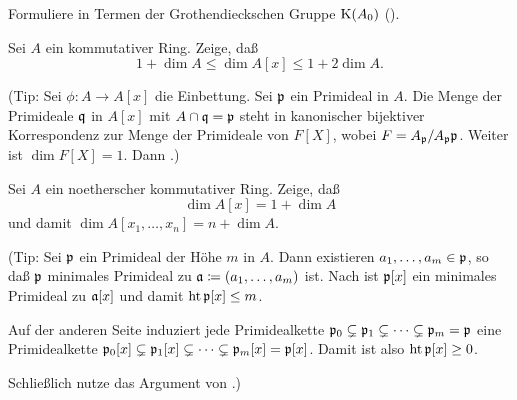 \begin{exercise}
	Formuliere  in Termen der Grothendieckschen Gruppe \(\operatorname{K}(A_0)\) (). 
\end{exercise}

\begin{exercise}
	\label{exer:poly_dim}
	Sei \(A\) ein kommutativer Ring. Zeige, daß
	\[
		1 + \dim A \le \dim A[x] \le 1 + 2 \dim A.
	\]
	
	(Tip: Sei \(\phi\colon A \to A[x]\) die Einbettung. Sei \(\mathfrak{p}\) ein Primideal in \(A\). Die Menge der Primideale
	\(\mathfrak{q}\) in \(A[x]\) mit \(A \cap \mathfrak{q} = \mathfrak{p}\) steht in kanonischer bijektiver Korrespondenz zur Menge der
	Primideale von \(F[X]\), wobei \(F = A_{\mathfrak{p}}/A_{\mathfrak{p}} \mathfrak{p}\). Weiter ist \(\dim F[X] = 1\). Dann
	.)
\end{exercise}

\begin{exercise}
	Sei \(A\) ein noetherscher kommutativer Ring. Zeige, daß
	\[
		\dim A[x] = 1 + \dim A
	\]
	und damit \(\dim A[x_1, \dotsc, x_n] = n + \dim A\).
	
	(Tip: Sei \(\mathfrak{p}\) ein Primideal der Höhe \(m\) in \(A\). Dann existieren \(a_1, \dotsc, a_m \in \mathfrak{p}\), so daß
	\(\mathfrak{p}\) minimales Primideal zu \(\mathfrak{a} \coloneqq (a_1, \dotsc, a_m)\) ist. Nach 
	ist \(\mathfrak{p}[x]\)	ein minimales Primideal zu \(\mathfrak{a}[x]\) und damit \(\operatorname{ht} \mathfrak{p}[x] \leq m\).
	
	Auf der anderen Seite induziert jede Primidealkette \(\mathfrak{p}_0 \subsetneq \mathfrak{p}_1 \subsetneq \dotsb \subsetneq
	\mathfrak{p}_m = \mathfrak{p}\) eine Primidealkette \(\mathfrak{p}_0[x] \subsetneq \mathfrak{p}_1[x] \subsetneq \dotsb \subsetneq
	\mathfrak{p}_m[x] = \mathfrak{p}[x]\). Damit ist also \(\operatorname{ht} \mathfrak{p}[x] \ge 0\).
	
	Schließlich nutze das Argument von .)
\end{exercise}


